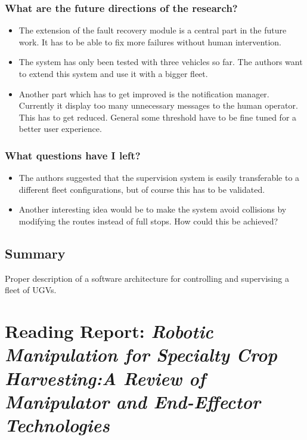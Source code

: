    \subsubsection*{What are the future directions of the research?}
    \begin{itemize}
        \item The extension of the fault recovery module is a central part in the future work. It has to be able to fix more failures without human intervention. 
        \item The system has only been tested with three vehicles so far. The authors want to extend this system and use it with a bigger fleet.
        \item Another part which has to get improved is the notification manager. Currently it display too many unnecessary messages to the human operator. This has to get reduced. General some threshold have to be fine tuned for a better user experience.
    \end{itemize}
    \subsubsection*{What questions have I left?}
    \begin{itemize}
        \item The authors suggested that the supervision system is easily transferable to a different fleet configurations, but of course this has to be validated. 
        \item Another interesting idea would be to make the system avoid collisions by modifying the routes instead of full stops. How could this be achieved?
    \end{itemize}
    
    \subsection*{Summary}
    Proper description of a software architecture for controlling and supervising a fleet of UGVs.

    
    \newpage
    \section{Reading Report: \emph{Robotic Manipulation for Specialty Crop Harvesting:A Review of Manipulator and End-Effector Technologies}}
    \label{sec:Davidson2020}
    \cite{Davidson2020}
    
